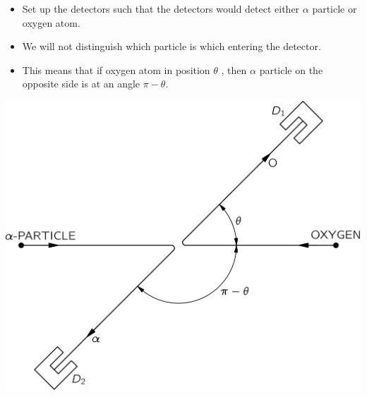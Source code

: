 \documentclass[aspectratio=169]{beamer}
\begin{document}
\begin{frame}{}

	\begin{multicols}{2}
 
 		\begin{itemize}
	
			\item Set up the detectors such that the detectors would detect either $\alpha$ particle or oxygen atom.\pause \newline
			\item We will not distinguish which particle is which entering the detector.\pause \newline
			\item This means that if oxygen atom in position $\theta$ , then
		$\alpha$ particle on the opposite side is at an angle $\pi-\theta$.
		
		\end{itemize}
	
	\columnbreak
	
		\includegraphics[scale=0.45]{alpha-ox-2.png} 
	
	\end{multicols}
	
		
\end{frame}
\end{document}
